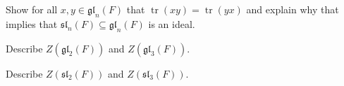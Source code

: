 \documentclass[12 pt, letterpaper]{hmcpset}
\begin{document}
\begin{problem}[1.]
	Show for all $x, y \in \mathfrak{gl}_{n}(F)$ that $\operatorname{tr}(xy) = \operatorname{tr}(yx)$ and explain why that implies that $\mathfrak{sl}_{n}(F) \subseteq \mathfrak{gl}_{n}(F)$ is an ideal.
\end{problem}

\pagebreak

\begin{problem}[2.]
	Describe $Z(\mathfrak{gl}_{2}(F))$ and $Z(\mathfrak{gl}_{3}(F))$.
\end{problem}

\pagebreak

\begin{problem}[3.]
	Describe $Z(\mathfrak{sl}_{2}(F))$ and $Z(\mathfrak{sl}_{3}(F))$.
\end{problem}
\end{document}
